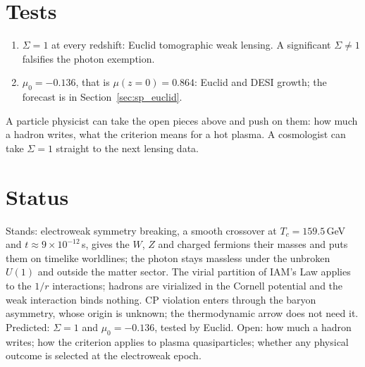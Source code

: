 \section{Tests}\label{sec:ew:tests}
\begin{enumerate}
\item $\Sigma=1$ at every redshift: Euclid tomographic weak lensing. A significant $\Sigma\neq1$ falsifies the photon exemption. \prediction
\item $\mu_0=-0.136$, that is $\mu(z{=}0)=0.864$: Euclid and DESI growth; the forecast is in Section~\ref{sec:sp_euclid}. \prediction
\end{enumerate}

A particle physicist can take the open pieces above and push on them: how much a hadron writes, what the criterion means for a hot plasma. A cosmologist can take $\Sigma=1$ straight to the next lensing data.

\section{Status}
Stands: electroweak symmetry breaking, a smooth crossover at $T_c=159.5$\,GeV and $t\approx9\times10^{-12}$\,s, gives the $W$, $Z$ and charged fermions
their masses and puts them on timelike worldlines; the photon stays massless under the unbroken $U(1)$ and outside the matter sector. \derived{} The
virial partition of IAM's Law applies to the $1/r$ interactions; hadrons are virialized in the Cornell potential and the weak interaction binds
nothing. \derived{} CP violation enters through the baryon asymmetry, whose origin is unknown; the thermodynamic arrow does not need it. Predicted:
$\Sigma=1$ and $\mu_0=-0.136$, tested by Euclid. \prediction{} Open: how much a hadron writes; how the criterion applies to plasma quasiparticles; whether
any physical outcome is selected at the electroweak epoch. \openprob
